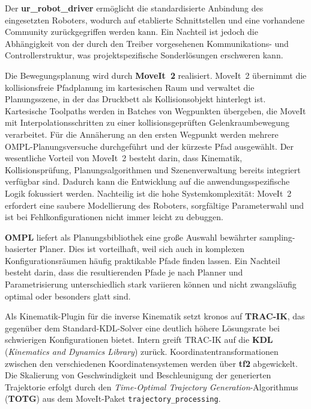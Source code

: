         Der \textbf{ur\_robot\_driver} ermöglicht die standardisierte Anbindung des eingesetzten Roboters,
        wodurch auf etablierte Schnittstellen und eine vorhandene Community zurückgegriffen werden kann.
        Ein Nachteil ist jedoch die Abhängigkeit von der durch den Treiber vorgesehenen Kommunikations- und Controllerstruktur,
        was projektspezifische Sonderlösungen erschweren kann.

        Die Bewegungsplanung wird durch \textbf{MoveIt~2} realisiert.
        MoveIt~2 übernimmt die kollisionsfreie Pfadplanung im kartesischen Raum und verwaltet die Planungsszene,
        in der das Druckbett als Kollisionsobjekt hinterlegt ist.
        Kartesische Toolpaths werden in Batches von Wegpunkten übergeben,
        die MoveIt mit Interpolationsschritten zu einer kollisionsgeprüften Gelenkraumbewegung verarbeitet.
        Für die Annäherung an den ersten Wegpunkt werden mehrere OMPL-Planungsversuche durchgeführt und der kürzeste Pfad ausgewählt.
        Der wesentliche Vorteil von MoveIt~2 besteht darin,
        dass Kinematik,
        Kollisionsprüfung,
        Planungsalgorithmen und Szenenverwaltung bereits integriert verfügbar sind.
        Dadurch kann die Entwicklung auf die anwendungsspezifische Logik fokussiert werden.
        Nachteilig ist die hohe Systemkomplexität:
        MoveIt~2 erfordert eine saubere Modellierung des Roboters,
        sorgfältige Parameterwahl und ist bei Fehlkonfigurationen nicht immer leicht zu debuggen.

        \textbf{OMPL} liefert als Planungsbibliothek eine große Auswahl bewährter sampling-basierter Planer.
        Dies ist vorteilhaft,
        weil sich auch in komplexen Konfigurationsräumen häufig praktikable Pfade finden lassen.
        Ein Nachteil besteht darin,
        dass die resultierenden Pfade je nach Planner und Parametrisierung unterschiedlich stark variieren können
        und nicht zwangsläufig optimal oder besonders glatt sind.

        Als Kinematik-Plugin für die inverse Kinematik setzt \ac{kronos} auf \textbf{TRAC-IK},
        das gegenüber dem Standard-\ac{KDL}-Solver eine deutlich höhere Lösungsrate bei schwierigen Konfigurationen bietet.
        Intern greift TRAC-IK auf die \textbf{\ac{KDL}} (\textit{Kinematics and Dynamics Library}) zurück.
        Koordinatentransformationen zwischen den verschiedenen Koordinatensystemen werden über \textbf{tf2} abgewickelt.
        Die Skalierung von Geschwindigkeit und Beschleunigung der generierten Trajektorie erfolgt durch den
        \textit{Time-Optimal Trajectory Generation}-Algorithmus (\textbf{TOTG}) aus dem MoveIt-Paket \texttt{trajectory\_processing}.
